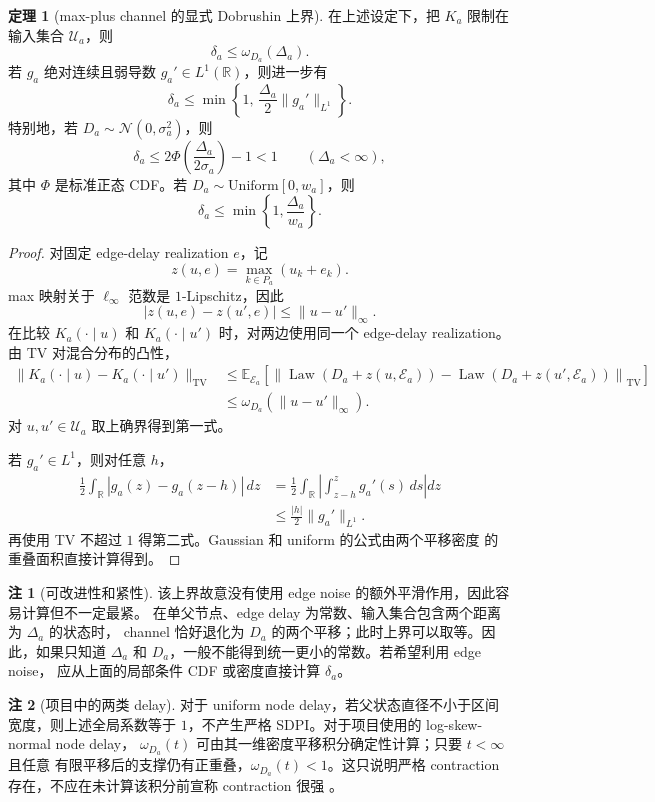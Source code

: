 \documentclass[a4paper,11pt]{article}
\theoremstyle{definition}
\newtheorem{theorem}{定理}
\newtheorem{remark}{注}
\newcommand{\R}{\mathbb R}
\newcommand{\E}{\mathbb E}
\newcommand{\1}{\mathbf 1}
\newcommand{\TV}{\mathrm{TV}}
\newcommand{\Law}{\operatorname{Law}}
\begin{document}
\begin{theorem}[max-plus channel 的显式 Dobrushin 上界]
\label{thm:localch}
在上述设定下，把 $K_a$ 限制在输入集合 $\mathcal U_a$，则
\[
\delta_a
\le
\omega_{D_a}(\Delta_a).
\]
若 $g_a$ 绝对连续且弱导数 $g_a'\in L^1(\R)$，则进一步有
\[
\delta_a
\le
\min\left\{
1,\,
\frac{\Delta_a}{2}\|g_a'\|_{L^1}
\right\}.
\]
特别地，若 $D_a\sim\mathcal N(0,\sigma_a^2)$，则
\[
\delta_a
\le
2\Phi\left(\frac{\Delta_a}{2\sigma_a}\right)-1<1
\qquad(\Delta_a<\infty),
\]
其中 $\Phi$ 是标准正态 CDF。若 $D_a\sim\mathrm{Uniform}[0,w_a]$，则
\[
\delta_a
\le
\min\left\{1,\frac{\Delta_a}{w_a}\right\}.
\]
\end{theorem}

\begin{proof}
对固定 edge-delay realization $e$，记
\[
z(u,e)=\max_{k\in P_a}(u_k+e_k).
\]
max 映射关于 $\ell_\infty$ 范数是 $1$-Lipschitz，因此
\[
|z(u,e)-z(u',e)|\le\|u-u'\|_\infty.
\]
在比较 $K_a(\cdot\mid u)$ 和 $K_a(\cdot\mid u')$ 时，对两边使用同一个
edge-delay realization。由 TV 对混合分布的凸性，
\[
\begin{aligned}
\|K_a(\cdot\mid u)-K_a(\cdot\mid u')\|_{\TV}
&\le
\E_{\mathcal E_a}
\left[
\left\|
\Law(D_a+z(u,\mathcal E_a))
-
\Law(D_a+z(u',\mathcal E_a))
\right\|_{\TV}
\right]\\
&\le
\omega_{D_a}(\|u-u'\|_\infty).
\end{aligned}
\]
对 $u,u'\in\mathcal U_a$ 取上确界得到第一式。

若 $g_a'\in L^1$，则对任意 $h$，
\[
\begin{aligned}
\frac12\int_\R|g_a(z)-g_a(z-h)|\,dz
&=
\frac12\int_\R
\left|\int_{z-h}^{z}g_a'(s)\,ds\right|dz\\
&\le
\frac{|h|}{2}\|g_a'\|_{L^1}.
\end{aligned}
\]
再使用 TV 不超过 $1$ 得第二式。Gaussian 和 uniform 的公式由两个平移密度
的重叠面积直接计算得到。
\end{proof}

\begin{remark}[可改进性和紧性]
该上界故意没有使用 edge noise 的额外平滑作用，因此容易计算但不一定最紧。
在单父节点、edge delay 为常数、输入集合包含两个距离为 $\Delta_a$ 的状态时，
channel 恰好退化为 $D_a$ 的两个平移；此时上界可以取等。因此，如果只知道
$\Delta_a$ 和 $D_a$，一般不能得到统一更小的常数。若希望利用 edge noise，
应从上面的局部条件 CDF 或密度直接计算 $\delta_a$。
\end{remark}

\begin{remark}[项目中的两类 delay]
对于 uniform node delay，若父状态直径不小于区间宽度，则上述全局系数等于
$1$，不产生严格 SDPI。对于项目使用的 log-skew-normal node delay，
$\omega_{D_a}(t)$ 可由其一维密度平移积分确定性计算；只要 $t<\infty$ 且任意
有限平移后的支撑仍有正重叠，$\omega_{D_a}(t)<1$。这只说明严格 contraction
存在，不应在未计算该积分前宣称 contraction 很强
\cite{PolyanskiyWu2016,Calmon2018}。
\end{remark}
\end{document}
